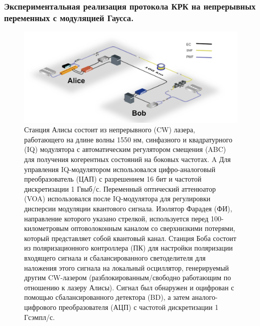 \subsubsection{Экспериментальная реализация протокола КРК на непрерывных переменных с модуляцией Гаусса.}
\begin{figure}
    \centering
    \includegraphics[width=0.9\linewidth]{images/QKD CV LLO.png}
    \caption{Станция Алисы состоит из непрерывного (CW) лазера, работающего на длине волны 1550 нм, синфазного и квадратурного (IQ) модулятора с автоматическим регулятором смещения (ABC) для получения когерентных состояний на боковых частотах. A Для управления IQ-модулятором использовался цифро-аналоговый преобразователь (ЦАП) с разрешением 16 бит и частотой дискретизации 1 Гвыб/с. Переменный оптический аттенюатор (VOA) использовался после IQ-модулятора для регулировки дисперсии модуляции квантового сигнала. Изолятор Фарадея (ФИ), направление которого указано стрелкой, используется перед 100-километровым оптоволоконным каналом со сверхнизкими потерями, который представляет собой квантовый канал. Станция Боба состоит из поляризационного контроллера (ПК) для настройки поляризации входящего сигнала и сбалансированного светоделителя для наложения этого сигнала на локальный осциллятор, генерируемый другим CW-лазером (разблокированным/свободно работающим по отношению к лазеру Алисы). Сигнал был обнаружен и оцифрован с помощью сбалансированного детектора (BD), а затем аналого-цифрового преобразователя (АЦП) с частотой дискретизации 1 Гсэмпл/с.}
    \label{fig:CV QKD ЛЛО lit}
\end{figure}

